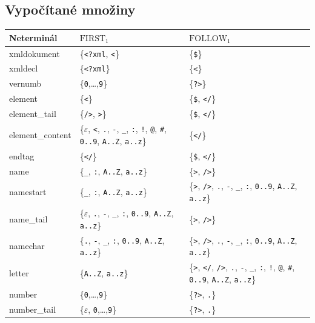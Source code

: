 \documentclass[12pt,a4paper]{article}
\newcommand{\eps}{\varepsilon}
\newcommand{\First}{\mathrm{FIRST}_1}
\newcommand{\Follow}{\mathrm{FOLLOW}_1}
\begin{document}
\subsection{Vypočítané množiny}

\begin{longtable}{>{\ttfamily}p{}p{}p{}}
\toprule
\normalfont Neterminál & \(\First\) & \(\Follow\) \\
\midrule
\endhead
xmldokument & \{\texttt{<?xml}, \texttt{<}\} & \{\texttt{\$}\} \\
xmldecl & \{\texttt{<?xml}\} & \{\texttt{<}\} \\
vernumb & \{\texttt{0},\ldots,\texttt{9}\} & \{\texttt{?>}\} \\
element & \{\texttt{<}\} & \{\texttt{\$}, \texttt{</}\} \\
element\_tail & \{\texttt{/>}, \texttt{>}\} & \{\texttt{\$}, \texttt{</}\} \\
element\_content & \{\(\eps\), \texttt{<}, \texttt{.}, \texttt{-}, \texttt{\_}, \texttt{:}, \texttt{!}, \texttt{@}, \texttt{\#}, \texttt{0..9}, \texttt{A..Z}, \texttt{a..z}\} & \{\texttt{</}\} \\
endtag & \{\texttt{</}\} & \{\texttt{\$}, \texttt{</}\} \\
name & \{\texttt{\_}, \texttt{:}, \texttt{A..Z}, \texttt{a..z}\} & \{\texttt{>}, \texttt{/>}\} \\
namestart & \{\texttt{\_}, \texttt{:}, \texttt{A..Z}, \texttt{a..z}\} & \{\texttt{>}, \texttt{/>}, \texttt{.}, \texttt{-}, \texttt{\_}, \texttt{:}, \texttt{0..9}, \texttt{A..Z}, \texttt{a..z}\} \\
name\_tail & \{\(\eps\), \texttt{.}, \texttt{-}, \texttt{\_}, \texttt{:}, \texttt{0..9}, \texttt{A..Z}, \texttt{a..z}\} & \{\texttt{>}, \texttt{/>}\} \\
namechar & \{\texttt{.}, \texttt{-}, \texttt{\_}, \texttt{:}, \texttt{0..9}, \texttt{A..Z}, \texttt{a..z}\} & \{\texttt{>}, \texttt{/>}, \texttt{.}, \texttt{-}, \texttt{\_}, \texttt{:}, \texttt{0..9}, \texttt{A..Z}, \texttt{a..z}\} \\
letter & \{\texttt{A..Z}, \texttt{a..z}\} & \{\texttt{>}, \texttt{</}, \texttt{/>}, \texttt{.}, \texttt{-}, \texttt{\_}, \texttt{:}, \texttt{!}, \texttt{@}, \texttt{\#}, \texttt{0..9}, \texttt{A..Z}, \texttt{a..z}\} \\
number & \{\texttt{0},\ldots,\texttt{9}\} & \{\texttt{?>}, \texttt{.}\} \\
number\_tail & \{\(\eps\), \texttt{0},\ldots,\texttt{9}\} & \{\texttt{?>}, \texttt{.}\} \\

\end{longtable}
\end{document}
